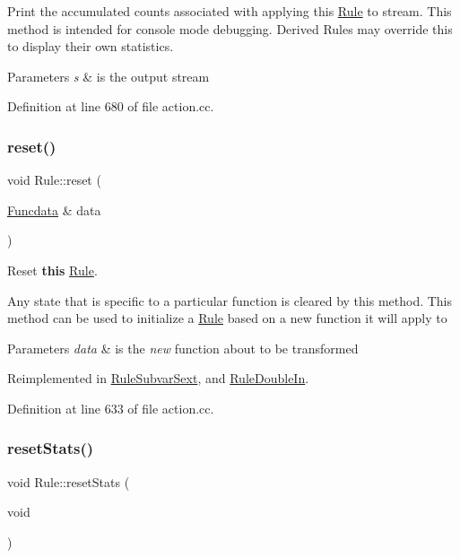 Print the accumulated counts associated with applying this \mbox{\hyperlink{class_rule}{Rule}} to stream. This method is intended for console mode debugging. Derived Rules may override this to display their own statistics. 
\begin{DoxyParams}{Parameters}
{\em s} & is the output stream \\
\hline
\end{DoxyParams}


Definition at line 680 of file action.\+cc.

\mbox{\label{class_rule_a1f074d593a6fefc79a5c07e4b3e13674}} 
\subsubsection{\texorpdfstring{reset()}{reset()}}
{\footnotesize\ttfamily void Rule\+::reset (\begin{DoxyParamCaption}\item[{\mbox{\hyperlink{class_funcdata}{Funcdata}} \&}]{data }\end{DoxyParamCaption})\hspace{0.3cm}{\ttfamily [virtual]}}



Reset {\bfseries{this}} \mbox{\hyperlink{class_rule}{Rule}}. 

Any state that is specific to a particular function is cleared by this method. This method can be used to initialize a \mbox{\hyperlink{class_rule}{Rule}} based on a new function it will apply to 
\begin{DoxyParams}{Parameters}
{\em data} & is the {\itshape new} function about to be transformed \\
\hline
\end{DoxyParams}


Reimplemented in \mbox{\hyperlink{class_rule_subvar_sext_a49bc2d4beb4624eda70e07f702aa39ab}{Rule\+Subvar\+Sext}}, and \mbox{\hyperlink{class_rule_double_in_a9feb1ec4c3183551094c745c169ee14e}{Rule\+Double\+In}}.



Definition at line 633 of file action.\+cc.

\mbox{\label{class_rule_adc634cc8f189a6641aac6e24e2473103}} 
\subsubsection{\texorpdfstring{resetStats()}{resetStats()}}
{\footnotesize\ttfamily void Rule\+::reset\+Stats (\begin{DoxyParamCaption}\item[{void}]{ }\end{DoxyParamCaption})\hspace{0.3cm}{\ttfamily [virtual]}}



